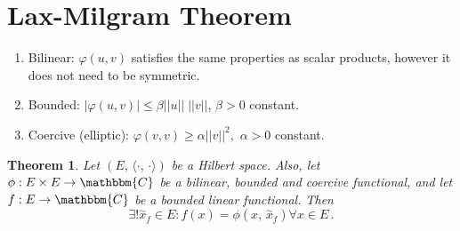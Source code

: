 \documentclass[12pt, a4paper]{article}
\newcommand{\C}{\ensuremath{\mathbbm{C}}}
\newtheorem{theorem}{Theorem}[section]
\begin{document}
\section{Lax-Milgram Theorem}

\begin{enumerate}
\item Bilinear: $\varphi(u,v)$ satisfies the same properties as scalar products, however it does not need to be symmetric.
\item Bounded: $|\varphi(u,v)| \leq \beta ||u|| \; ||v||$, $\beta>0$ constant.
\item Coercive (elliptic): $\varphi(v,v) \geq \alpha ||v||^2,$ $\alpha>0$ constant.
\end{enumerate}

\begin{theorem}
Let $(E,\,\langle\cdot,\,\cdot\rangle)$ be a Hilbert space. Also, let $\phi:E\times E\to\C$ be a bilinear, bounded and coercive functional, and let $f:E\to\C$ be a bounded linear functional. Then
\[
    \exists!\overset{\sim}{x}_f\in E:f(x)=\phi(x,\,\overset{\sim}{x}_f)\forall x\in E\,.
\]
\end{theorem}
\end{document}
